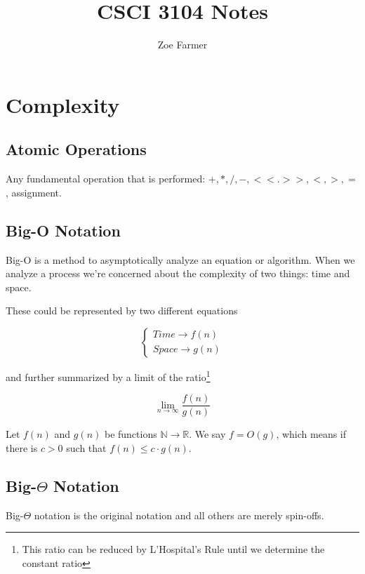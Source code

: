 \documentclass[10pt]{article}
\title{CSCI 3104 Notes}
\author{Zoe Farmer}
\begin{document}
\maketitle

\tableofcontents    %
\newpage


\section{Complexity}

    \subsection{Atomic Operations}
    Any fundamental operation that is performed: $ +, *, /, -, <<. >>, <, >, = $, assignment.

    \subsection{Big-O Notation}
    Big-O is a method to asymptotically analyze an equation or algorithm. When we analyze a process we're concerned about the complexity of two things: time and space.

    These could be represented by two different equations

        \[ \begin{cases} Time \to f(n)\\ Space \to g(n) \end{cases} \]

    and further summarized by a limit of the ratio\footnote{This ratio can be reduced by L'Hospital's Rule until we determine the constant ratio}

        \[ \lim_{n \to \infty} \frac{f(n)}{g(n)} \]

    \begin{thm}
        Let $f(n)$ and $g(n)$ be functions $\mathbb{N} \to \mathbb{R}$. We say $f = O(g)$, which means if there is $c > 0$ such that $f(n) \le c \cdot g(n)$.
    \end{thm}

    \subsection{Big-$\Theta$ Notation}
    Big-$\Theta$ notation is the original notation and all others are merely spin-offs.
\end{document}
